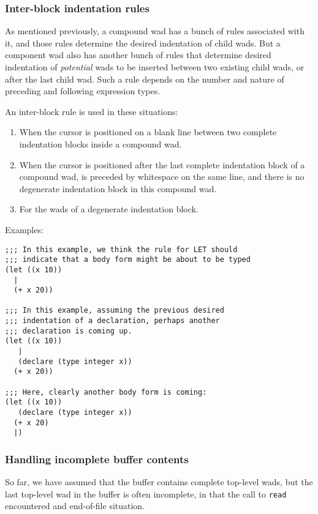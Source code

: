 \subsubsection{Inter-block indentation rules}

As mentioned previously, a compound wad has a bunch of rules
associated with it, and those rules determine the desired indentation
of child wads.  But a component wad also has another bunch of rules
that determine desired indentation of \emph{potential} wads to be
inserted between two existing child wads, or after the last child
wad.  Such a rule depends on the number and nature of preceding and
following expression types.

An inter-block rule is used in these situations:

\begin{enumerate}
\item When the cursor is positioned on a blank line between two
  complete indentation blocks inside a compound wad.
\item When the cursor is positioned after the last complete
  indentation block of a compound wad, is preceded by whitespace on
  the same line, and there is no degenerate indentation block in this
  compound wad.
\item For the wads of a degenerate indentation block.
\end{enumerate}

Examples:

\begin{verbatim}
;;; In this example, we think the rule for LET should
;;; indicate that a body form might be about to be typed
(let ((x 10))
  |
  (+ x 20))

;;; In this example, assuming the previous desired
;;; indentation of a declaration, perhaps another  
;;; declaration is coming up.
(let ((x 10))
   |
   (declare (type integer x))
  (+ x 20))

;;; Here, clearly another body form is coming:  
(let ((x 10))
   (declare (type integer x))
  (+ x 20)
  |)
\end{verbatim}

\subsubsection{Handling incomplete buffer contents}

So far, we have assumed that the buffer contains complete top-level
wads, but the last top-level wad in the buffer is often incomplete, in
that the call to \texttt{read} encountered and end-of-file situation.

